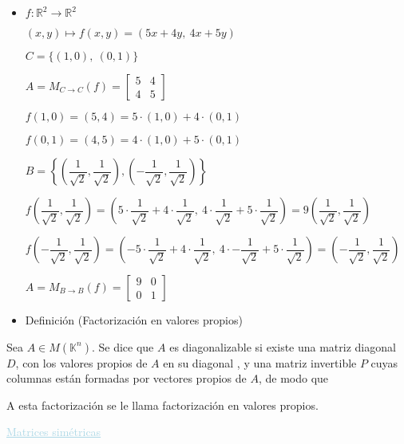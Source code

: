 \documentclass[12pt]{article}
\begin{document}
\begin{itemize}
\item[] $f:\mathbb{R}^2\longrightarrow\mathbb{R}^2$

$(x,y)\longmapsto f(x,y)=(5x+4y,~4x+5y)$

$C=\{(1,0),~(0,1)\}$

$A=M_{C\rightarrow C}(f)=\begin{bmatrix}
5 & 4 \\ 
4 & 5
\end{bmatrix} $

$f(1,0)=(5,4)=5\cdot(1,0)+4\cdot (0,1)$

$f(0,1)=(4,5)=4\cdot(1,0)+5\cdot(0,1)$

$B=\left\lbrace\left(\dfrac{1}{\sqrt{2}},\dfrac{1}{\sqrt{2}}\right),\left(-\dfrac{1}{\sqrt{2}},\dfrac{1}{\sqrt{2}}\right)\right\rbrace$

$f\left(\dfrac{1}{\sqrt{2}},\dfrac{1}{\sqrt{2}}\right)=\left(5\cdot\dfrac{1}{\sqrt{2}}+4\cdot\dfrac{1}{\sqrt{2}},~4\cdot\dfrac{1}{\sqrt{2}}+5\cdot\dfrac{1}{\sqrt{2}}\right)=9\left(\dfrac{1}{\sqrt{2}},\dfrac{1}{\sqrt{2}}\right)$

$f\left(-\dfrac{1}{\sqrt{2}},\dfrac{1}{\sqrt{2}}\right)=\left(-5\cdot\dfrac{1}{\sqrt{2}}+4\cdot\dfrac{1}{\sqrt{2}},~4\cdot-\dfrac{1}{\sqrt{2}}+5\cdot\dfrac{1}{\sqrt{2}}\right)=\left(-\dfrac{1}{\sqrt{2}},\dfrac{1}{\sqrt{2}}\right)$

$A=M_{B\rightarrow B}(f)=\begin{bmatrix}
9 & 0 \\ 
0 & 1
\end{bmatrix} $
\end{itemize}
\begin{itemize}[label=\color{red}\textbullet, leftmargin=*]
    \item \color{lightblue} Definición (Factorización en valores propios)
\end{itemize}
Sea $A\in M(\mathbb{K}^n)$. Se dice que $A$ es diagonalizable si existe una matriz diagonal $D$, con los valores propios de $A$ en su diagonal , y una matriz invertible $P$ cuyas columnas están formadas por vectores propios de $A$, de modo que \begin{center}
\end{center}
A esta factorización se le llama factorización en valores propios.

\textcolor{lightblue}{\underline{Matrices simétricas}}
\end{document}
